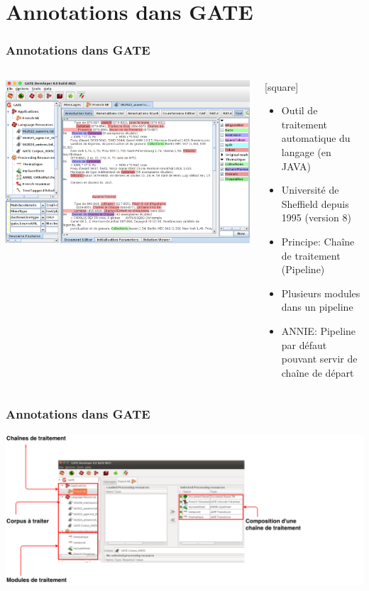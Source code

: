 \documentclass[10pt, compress]{beamer}
\begin{document}
\section{Annotations dans GATE}
\begin{frame}[fragile]
\frametitle{Annotations dans GATE}
\begin{columns}
	\begin{center}
	\includegraphics[scale=0.190]{img/gate.png} 
	\end{center}
	\begin{scriptsize}
		[square]
	\begin{itemize}
		\item{Outil de traitement automatique du langage (en JAVA)}
		\item{Université de Sheffield depuis 1995 (version 8)}
		\item{Principe: Chaîne de traitement (Pipeline)}
		\item{Plusieurs modules dans un pipeline}
		\item{ANNIE: Pipeline par défaut pouvant servir de chaîne de départ}
	\end{itemize}
	\end{scriptsize}
\end{columns}
\end{frame}

\begin{frame}[fragile]
\frametitle{Annotations dans GATE}
	\begin{center}
	\includegraphics[scale=0.275]{img/gatePresent.png} 
	\end{center}
\end{frame}
\end{document}
